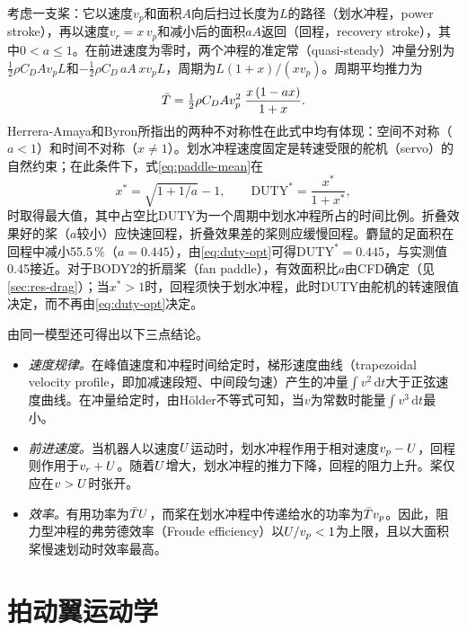考虑一支桨：它以速度$v_p$和面积$A$向后扫过长度为$L$的路径（划水冲程，power stroke），再以速度$v_r=x\,v_p$和减小后的面积$aA$返回（回程，recovery stroke），其中$0<a\le 1$。在前进速度为零时，两个冲程的准定常（quasi-steady）冲量分别为$\tfrac12\rho C_D A v_p L$和$-\tfrac12\rho C_D\,aA\,x v_p L$，周期为$L(1+x)/(x v_p)$。周期平均推力为
\begin{equation}
  \bar{T} = \tfrac12\rho C_D A v_p^2\;\frac{x\,(1-a x)}{1+x}.
  \label{eq:paddle-mean}
\end{equation}
Herrera-Amaya和Byron\cite{HerreraAmaya2024}所指出的两种不对称性在此式中均有体现：空间不对称（$a<1$）和时间不对称（$x\neq1$）。划水冲程速度固定是转速受限的舵机（servo）的自然约束；在此条件下，式\eqref{eq:paddle-mean}在
\begin{equation}
  x^* = \sqrt{1+1/a}-1, \qquad \mathrm{DUTY}^* = \frac{x^*}{1+x^*},
  \label{eq:duty-opt}
\end{equation}
时取得最大值，其中占空比DUTY为一个周期中划水冲程所占的时间比例。折叠效果好的桨（$a$较小）应快速回程，折叠效果差的桨则应缓慢回程。麝鼠的足面积在回程中减小55.5\,\%（$a=0.445$），由\eqref{eq:duty-opt}可得$\mathrm{DUTY}^*=0.445$，与实测值0.45接近\cite{Fish1984}。对于BODY2的折扇桨（fan paddle），有效面积比$a$由CFD确定（见\cref{sec:res-drag}）；当$x^*>1$时，回程须快于划水冲程，此时DUTY由舵机的转速限值决定，而不再由\eqref{eq:duty-opt}决定。

由同一模型还可得出以下三点结论。
\begin{itemize}
  \item \emph{速度规律。}在峰值速度和冲程时间给定时，梯形速度曲线（trapezoidal velocity profile，即加减速段短、中间段匀速）产生的冲量$\int v^2\,\mathrm dt$大于正弦速度曲线。在冲量给定时，由H\"older不等式可知，当$v$为常数时能量$\int v^3\,\mathrm dt$最小。
  \item \emph{前进速度。}当机器人以速度$U$运动时，划水冲程作用于相对速度$v_p-U$，回程则作用于$v_r+U$。随着$U$增大，划水冲程的推力下降，回程的阻力上升。桨仅应在$v>U$时张开。
  \item \emph{效率。}有用功率为$\bar{T}U$，而桨在划水冲程中传递给水的功率为$\bar{T} v_p$。因此，阻力型冲程的弗劳德效率（Froude efficiency）以$U/v_p<1$为上限，且以大面积桨慢速划动时效率最高\cite{Fish1996,Walker2000}。
\end{itemize}

\section{拍动翼运动学}
\label{sec:fund-foil}

